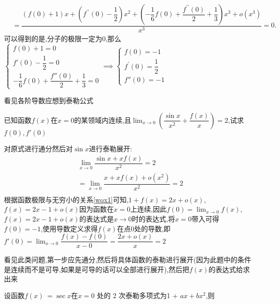 \documentclass[10pt, a4paper, oneside, UTF8]{ctexbook}
\begin{document}
\begin{sloppypar}
\begin{solution}
\begin{equation*}
\begin{split}
            & = \dfrac{(f(0)+1)x+(f^{\prime\prime}(0)-\dfrac{1}{2})x^{2}+(-\dfrac{1}{6}f(0)+\dfrac{f^{\prime\prime}(0)}{2}+\dfrac{1}{3})x^{3}+o(x^{3})}{x^{3}}=0.
    \end{split}
    \end{equation*}    
    可以得到的是,分子的极限一定为0,那么$\begin{cases}f(0)+1=0\\f'(0)-\dfrac{1}{2}=0\\-\dfrac{1}{6}f(0)+\dfrac{f''(0)}{2}+\dfrac{1}{3}=0\end{cases}\implies \begin{cases}f(0)=-1\\f^{\prime}(0)=\dfrac{1}{2}\\f''(0)=-1\end{cases}$
    \end{solution}
    \begin{note}
        看见各阶导数应想到泰勒公式
    \end{note}
    \begin{problem}
        已知函数$f(x)$在$x=0$的某领域内连续,且$\lim_{x \to 0}(\dfrac{\sin x}{x^2}+\dfrac{f(x)}{x})=2$,试求$f(0),f'(0)$
    \end{problem}
    \begin{solution}
        对原式进行通分然后对$\sin x$进行泰勒展开:
        \begin{equation*}
            \begin{split}    
                & \lim_{x \to 0}\dfrac{\sin x+xf(x)}{x^2}=2\\
                & = \lim_{x \to 0}\dfrac{x+xf(x)+o(x^2)}{x^2}=2 \\
            \end{split}
        \end{equation*} 
    根据函数极限与无穷小的关系\ref{wqx1}可知,$1+f(x)=2x+o(x)$,$f(x)=2x-1+o(x)$因为函数在$x=0$上连续,因此$f(0)=\lim_{x\to 0}f(x)$,$f(x)=2x-1+o(x)$的表达式是$x\to 0$时的表达式,将$x=0$带入可得$f(0)=-1$,使用导数定义求得$f(x)$在点0处的导数,即$f'(0)=\lim_{x \to 0}\dfrac{f(x)-f(0)}{x-0}=\dfrac{2x+o(x)}{x}=2$
    \end{solution}
    \begin{note}
        看见此类问题,第一步应先通分,然后将具体函数的泰勒进行展开(因为此题中的条件是连续而不是可导,如果是可导的话可以全部进行展开),然后把$f(x)$的表达式给求出来
    \end{note}
    \begin{problem}
        设函数$f(x)\:=\sec x$在$x=0$ 处的 2 次泰勒多项式为1 + $ax+bx^2$,则\\

\end{problem}
\end{sloppypar}
\end{document}
